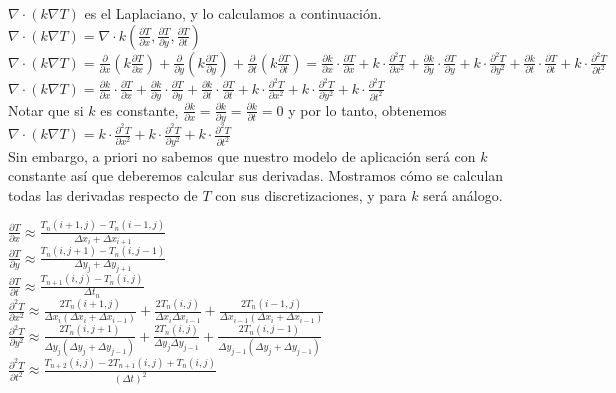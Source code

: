 \documentclass[a4paper]{article}
\begin{document}
$\nabla \cdot (k \nabla T)$ es el Laplaciano, y lo calculamos a continuación. \\

$\nabla \cdot (k \nabla T) = \nabla \cdot k (\frac{\partial T}{\partial x}, \frac{\partial T}{\partial y}, \frac{\partial T}{\partial t})$ \\
$\nabla \cdot (k \nabla T) = \frac{\partial}{\partial x} (k \frac{\partial T}{\partial x}) + \frac{\partial}{\partial y} (k \frac{\partial T}{\partial y}) + \frac{\partial}{\partial t} (k \frac{\partial T}{\partial t}) = \frac{\partial k}{\partial x} \cdot \frac{\partial T}{\partial x} + k \cdot \frac{\partial^2 T}{\partial x^2} + \frac{\partial k}{\partial y} \cdot \frac{\partial T}{\partial y} + k \cdot \frac{\partial^2 T}{\partial y^2} + \frac{\partial k}{\partial t} \cdot \frac{\partial T}{\partial t} + k \cdot \frac{\partial^2 T}{\partial t^2}$ \\
$\nabla \cdot (k \nabla T) = \frac{\partial k}{\partial x} \cdot \frac{\partial T}{\partial x} + \frac{\partial k}{\partial y} \cdot \frac{\partial T}{\partial y} + \frac{\partial k}{\partial t} \cdot \frac{\partial T}{\partial t} + k \cdot \frac{\partial^2 T}{\partial x^2} + k \cdot \frac{\partial^2 T}{\partial y^2} + k \cdot \frac{\partial^2 T}{\partial t^2}$ \\

Notar que si $k$ es constante, $\frac{\partial k}{\partial x} = \frac{\partial k}{\partial y} = \frac{\partial k}{\partial t} = 0$ y por lo tanto, obtenemos $\nabla \cdot (k \nabla T) = k \cdot \frac{\partial^2 T}{\partial x^2} + k \cdot \frac{\partial^2 T}{\partial y^2} + k \cdot \frac{\partial^2 T}{\partial t^2}$ \\
Sin embargo, a priori no sabemos que nuestro modelo de aplicación será con $k$ constante así que deberemos calcular sus derivadas. Mostramos cómo se calculan todas las derivadas respecto de $T$ con sus discretizaciones, y para $k$ será análogo.

\bigskip
$\frac{\partial T}{\partial x} \approx \frac{T_{n}(i+1,j) - T_n(i-1,j)}{\Delta x_i + \Delta x_{i+1}}$ \\
$\frac{\partial T}{\partial y} \approx \frac{T_{n}(i,j+1) - T_n(i,j-1)}{\Delta y_j + \Delta y_{j+1}}$ \\
$\frac{\partial T}{\partial t} \approx \frac{T_{n+1}(i,j) - T_n(i,j)}{\Delta t_n}$ \\
$\frac{\partial^2 T}{\partial x^2} \approx \frac{2 T_n(i+1,j)}{\Delta x_i (\Delta x_i + \Delta x_{i-1})} + \frac{2 T_n(i,j)}{\Delta x_i \Delta x_{i-1}} + \frac{2 T_n(i-1,j)}{\Delta x_{i-1} (\Delta x_i + \Delta x_{i-1})} $ \\
$\frac{\partial^2 T}{\partial y^2} \approx \frac{2 T_n(i,j+1)}{\Delta y_j (\Delta y_j + \Delta y_{j-1})} + \frac{2 T_n(i,j)}{\Delta y_j \Delta y_{j-1}} + \frac{2 T_n(i,j-1)}{\Delta y_{j-1} (\Delta y_j + \Delta y_{j-1})} $ \\
$\frac{\partial^2 T}{\partial t^2} \approx \frac{T_{n+2}(i,j) - 2 T_{n+1}(i,j) + T_n(i,j)}{(\Delta t)^2}$ \\
\end{document}
